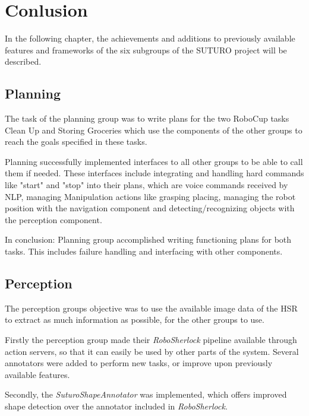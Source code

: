 \documentclass[main.tex]{subfiles}
\begin{document}
	\begingroup

	\renewcommand{\cleardoublepage}{}

	\renewcommand{\clearpage}{}

	\chapter{Conlusion}
		In the following chapter, the achievements and additions to previously available features and frameworks of the six subgroups of the SUTURO project will be described.
		
		\section{Planning}
		The task of the planning group was to write plans for the two RoboCup tasks Clean Up and Storing Groceries which use the components of the other groups to reach the goals specified in these tasks.
		
		Planning successfully implemented interfaces to all other groups to be able to call them if needed. These interfaces include integrating and handling hard commands like "start" and "stop" into their plans, which are voice commands received by NLP, managing Manipulation actions like grasping placing, managing the robot position with the navigation component and detecting/recognizing objects with the perception component.
		
		In conclusion: Planning group accomplished writing functioning plans for both tasks. This includes failure handling and interfacing with other components.
		
		\section{Perception}
		The perception groups objective was to use the available image data of the HSR to extract as much information as possible, for the other groups to use.
				
		Firstly the perception group made their \textit{RoboSherlock} pipeline available through action servers, so that it can easily be used by other parts of the system. Several annotators were added to perform new tasks, or improve upon previously available features. 
		
		Secondly, the \textit{SuturoShapeAnnotator} was implemented, which offers improved shape detection over the annotator included in \textit{RoboSherlock}. 
		
\end{document}
